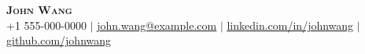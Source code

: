 \begin{center}
    \textbf{\Huge \scshape John Wang} \\ \vspace{1pt}
    \small +1 555-000-0000 $|$ \href{mailto:john.wang@example.com}{\underline{john.wang@example.com}} $|$
    \href{https://linkedin.com/in/johnwang}{\underline{linkedin.com/in/johnwang}} $|$
    \href{https://github.com/johnwang}{\underline{github.com/johnwang}}
\end{center}
